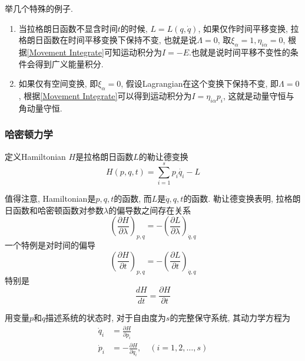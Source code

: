 \documentclass[a4paper,11pt]{article}
\theoremstyle{mystyle}
\begin{document}
举几个特殊的例子.
\begin{enumerate}
  \item 当拉格朗日函数不显含时间$t$的时候, $L=L(q,\dot{q})$, 如果仅作时间平移变换, 拉格朗日函数在时间平移变换下保持不变, 也就是说$\Lambda=0$, 取$\xi_\alpha=1,\eta_{i\alpha}=0$, 根据\eqref{Movement Integrate}可知运动积分为$I=-E$.也就是说时间平移不变性的条件会得到广义能量积分.
  \item 如果仅有空间变换, 即$\xi_\alpha=0$, 假设Lagrangian在这个变换下保持不变, 即$\Lambda=0$, 根据\eqref{Movement Integrate}可以得到运动积分为$I=\eta_{i\alpha}p_i$, 这就是动量守恒与角动量守恒.
\end{enumerate}
\subsubsection{哈密顿力学}
\begin{definition}[拉格朗日函数的勒让德变换]
  定义Hamiltonian $H$是拉格朗日函数$L$的勒让德变换
  \begin{equation}\label{Legendra trans}
    H(p,q,t)=\sum_{i=1}^{s}p_i\dot{q_i}-L
  \end{equation}
\end{definition}
值得注意, Hamiltonian是$p,q,t$的函数, 而$L$是$\dot{q},q,t$的函数. 勒让德变换表明, 拉格朗日函数和哈密顿函数对参数$\lambda$的偏导数之间存在关系
\begin{equation}\label{H,Lambda}
  \left(\frac{\partial H}{\partial \lambda}\right)_{p,q}=-\left(\frac{\partial L}{\partial \lambda}\right)_{\dot{q},q}
\end{equation}
一个特例是对时间的偏导
\begin{equation}\label{H,L}
  \left(\frac{\partial H}{\partial t}\right)_{p,q}=-\left(\frac{\partial L}{\partial t}\right)_{\dot{q},q}
\end{equation}
特别是
\begin{equation}\label{H,t}
  \frac{dH}{dt}=\frac{\partial H}{\partial t}
\end{equation}
\begin{definition}[哈密顿正则方程]
  用变量$p$和$q$描述系统的状态时, 对于自由度为$s$的完整保守系统, 其动力学方程为
  \begin{equation}\label{Hamilton equ}
  \begin{split}
     \dot{q}_i&=\frac{\partial H}{\partial{p_i}} \\
     \dot{p}_i&=-\frac{\partial H}{\partial{q_i}},\quad(i=1,2,\dots,s)
  \end{split}
  \end{equation}
\end{definition}
\end{document}
